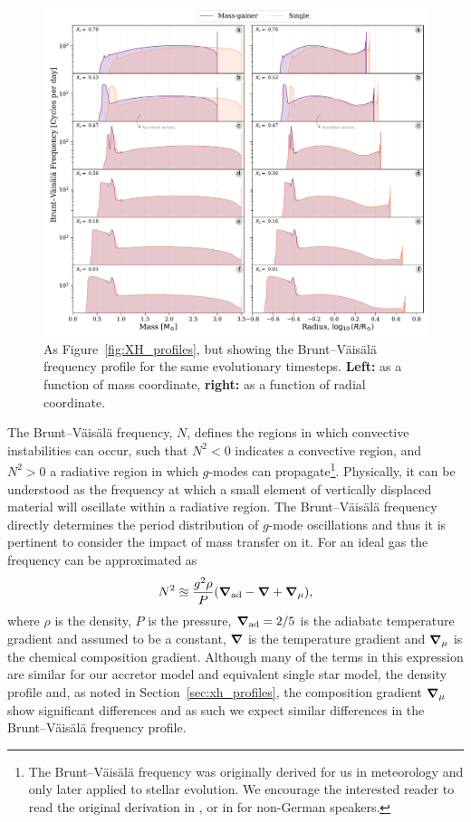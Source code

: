 \documentclass[twocolumn, twocolappendix, oneside]{aastex631}
\newcommand{\bvf}{Brunt–Väisälä frequency\xspace}
\newcommand{\gmode}{$g$-mode\xspace}
\newcommand{\gmodes}{$g$-modes\xspace}
\begin{document}
\begin{figure}
    \centering
    \includegraphics[width=\textwidth]{figures/BV_profile_all_combo.pdf}
    \caption{As Figure~\ref{fig:XH_profiles}, but showing the \bvf profile for the same evolutionary timesteps. \textbf{Left:} as a function of mass coordinate, \textbf{right:} as a function of radial coordinate.}
    \label{fig:BV_profiles}
\end{figure}

The \bvf \citep{BVF-vaisala, BVF-brunt}, $N$, defines the regions in which convective instabilities can occur, such that $N^2 < 0$ indicates a convective region, and $N^2 > 0$ a radiative region in which \gmodes can propagate\footnote{The \bvf was originally derived for us in meteorology and only later applied to stellar evolution. We encourage the interested reader to read the original derivation in \citet{BVF-vaisala}, or in \citet{BVF-brunt} for non-German speakers.}.
Physically, it can be understood as the frequency at which a small element of vertically displaced material will oscillate within a radiative region.
The \bvf directly determines the period distribution of \gmode oscillations and thus it is pertinent to consider the impact of mass transfer on it. For an ideal gas the frequency can be approximated as
\begin{equation}\label{eq:bvf}
    N^2 \approxeq \frac{g^2 \rho}{P} \qty(\grad_{\rm ad} - \grad + \grad_\mu),
\end{equation}
where $\rho$ is the density, $P$ is the pressure, $\grad_{\rm ad} = 2/5$ is the adiabatc temperature gradient and assumed to be a constant, $\grad$ is the temperature gradient and $\grad_\mu$ is the chemical composition gradient. Although many of the terms in this expression are similar for our accretor model and equivalent single star model, the density profile and, as noted in Section~\ref{sec:xh_profiles}, the composition gradient $\grad_\mu$ show significant differences and as such we expect similar differences in the \bvf profile.
\end{document}
